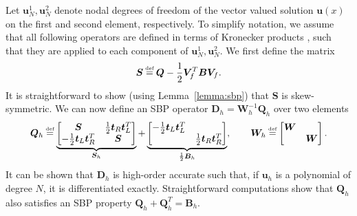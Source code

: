 \documentclass[review,onefignum,onetabnum,final]{siamart171218}
\newcommand\myeq{\mathrel{\stackrel{\makebox[0pt]{\mbox{\normalfont\tiny def}}}{=}}}
\begin{document}
Let $\bm{u}^1_N, \bm{u}^2_N$ denote nodal degrees of freedom of the vector valued solution $\bm{u}(x)$ on the first and second element, respectively.  To simplify notation, we assume that all following operators are defined in terms of Kronecker products \cite{chen2017entropy}, such that they are applied to each component of $\bm{u}^1_N, \bm{u}^2_N$.  
We first define the matrix 
\begin{equation}
\bm{S} \myeq \bm{Q} - \frac{1}{2}\bm{V}_f^T\bm{B}\bm{V}_f.
\label{eq:Smat}
\end{equation}
It is straightforward to show (using Lemma~\ref{lemma:sbp}) that $\bm{S}$ is skew-symmetric.  We can now define an SBP operator $\bm{D}_h = \bm{W}_h^{-1}\bm{Q}_h$ over two elements
\begin{equation}
\bm{Q}_{h} \myeq 
\underbrace{\begin{bmatrix}
\bm{S}  & \frac{1}{2}\bm{t}_R\bm{t}_L^T \\
- \frac{1}{2}\bm{t}_L\bm{t}_R^T & \bm{S}
\end{bmatrix}}_{\bm{S}_h}
+
\underbrace{\begin{bmatrix}
-\frac{1}{2}\bm{t}_L\bm{t}_L^T  & \\
 & \frac{1}{2} \bm{t}_R\bm{t}_R^T
\end{bmatrix}}_{\frac{1}{2}\bm{B}_h}
, \qquad 
\bm{W}_h \myeq \begin{bmatrix}\bm{W} &\\
& \bm{W}
\end{bmatrix}.
\label{eq:gsbp}
\end{equation}
It can be shown that $\bm{D}_h$ is high-order accurate such that, if $\bm{u}_h$ is a polynomial of degree $N$, it is differentiated exactly.  Straightforward computations show that $\bm{Q}_h$ also satisfies an SBP property $\bm{Q}_h + \bm{Q}_h^T = \bm{B}_h$.
\end{document}
